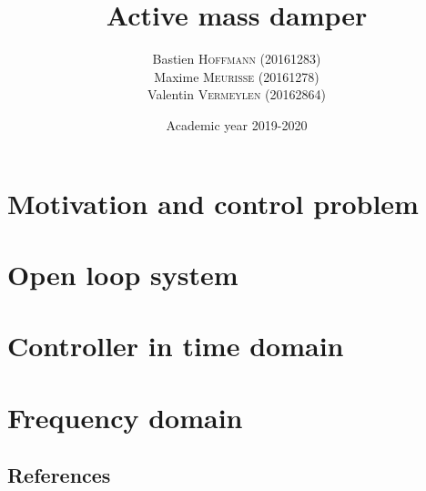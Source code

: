 \documentclass[a4paper, 12pt]{article}
\title{Active mass damper}
\author{
    Bastien \textsc{Hoffmann} (20161283)\\
    Maxime \textsc{Meurisse} (20161278)\\
    Valentin \textsc{Vermeylen} (20162864)\\
}
\date{Academic year 2019-2020}
\begin{document}
    
    
    \romantableofcontents
    
    \section{Motivation and control problem}
    
    
    
    
    \section{Open loop system}
    
    
    
    
    
    
    \section{Controller in time domain}
    
    
    
    
    
    \section{Frequency domain}
    
    
    
    
    
    \newpage
    \subsection{References}
    \nocite{*}
    \printbibliography
\end{document}
